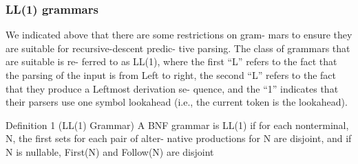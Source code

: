 \subsubsection{LL(1) grammars}
We indicated above that there are some restrictions on gram-
mars to ensure they are suitable for recursive-descent predic-
tive parsing. The class of grammars that are suitable is re-
ferred to as LL(1), where the first “L” refers to the fact that
the parsing of the input is from Left to right, the second “L”
refers to the fact that they produce a Leftmost derivation se-
quence, and the “1” indicates that their parsers use one symbol
lookahead (i.e., the current token is the lookahead).

Definition 1 (LL(1) Grammar) A BNF grammar is LL(1) if
for each nonterminal, N, the first sets for each pair of alter-
native productions for N are disjoint, and if N is nullable,
First(N) and Follow(N) are disjoint